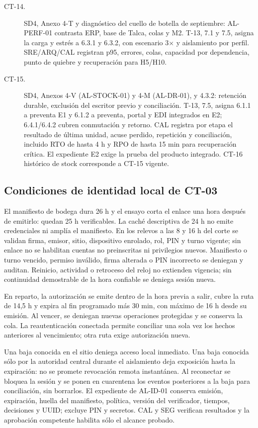 \begin{description}
\item[CT-14.] SD4, Anexo 4-T y diagnóstico del cuello de botella de septiembre: AL-PERF-01 contrasta ERP, base de Talca, colas y M2. T-13, 7.1 y 7.5, asigna la carga y estrés a 6.3.1 y 6.3.2, con escenario 3\ensuremath{\times} y aislamiento por perfil. SRE/ARQ/CAL registran p95, errores, colas, capacidad por dependencia, punto de quiebre y recuperación para H5/H10.
\item[CT-15.] SD4, Anexos 4-V (AL-STOCK-01) y 4-M (AL-DR-01), y 4.3.2: retención durable, exclusión del escritor previo y conciliación. T-13, 7.5, asigna 6.1.1 a preventa E1 y 6.1.2 a preventa, portal y EDI integrados en E2; 6.4.1/6.4.2 cubren conmutación y retorno. CAL registra por etapa el resultado de última unidad, acuse perdido, repetición y conciliación, incluido RTO de hasta 4 h y RPO de hasta 15 min para recuperación crítica. El expediente E2 exige la prueba del producto integrado. CT-16 histórico de stock corresponde a CT-15 vigente.
\end{description}

\subsection*{Condiciones de identidad local de CT-03}
El manifiesto de bodega dura 26 h y el ensayo corta el enlace una hora después
de emitirlo: quedan 25 h verificables. La caché descriptiva de 24 h no emite
credenciales ni amplía el manifiesto. En los relevos a las 8 y 16 h del corte se
validan firma, emisor, sitio, dispositivo enrolado, rol, PIN y turno vigente;
sin enlace no se habilitan cuentas no preinscritas ni privilegios nuevos.
Manifiesto o turno vencido, permiso inválido, firma alterada o PIN incorrecto
se deniegan y auditan. Reinicio, actividad o retroceso del reloj no extienden
vigencia; sin continuidad demostrable de la hora confiable se deniega sesión nueva.

En reparto, la autorización se emite dentro de la hora previa a salir, cubre
la ruta de 14,5 h y expira al fin programado más 30 min, con máximo de 16 h
desde su emisión. Al vencer, se deniegan nuevas operaciones protegidas y se
conserva la cola. La reautenticación conectada permite conciliar una sola vez
los hechos anteriores al vencimiento; otra ruta exige autorización nueva.

Una baja conocida en el sitio deniega acceso local inmediato. Una baja conocida
sólo por la autoridad central durante el aislamiento deja exposición hasta la
expiración: no se promete revocación remota instantánea. Al reconectar se bloquea
la sesión y se ponen en cuarentena los eventos posteriores a la baja para
conciliación, sin borrarlos. El expediente de AL-ID-01 conserva emisión,
expiración, huella del manifiesto, política, versión del verificador, tiempos,
decisiones y UUID; excluye PIN y secretos. CAL y SEG verifican resultados y
la aprobación competente habilita sólo el alcance probado.
